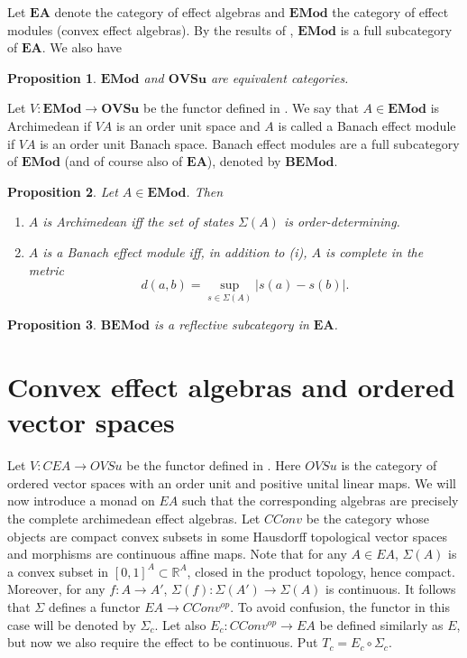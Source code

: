 \documentclass[12pt]{article}
\newtheorem{prop}{Proposition}
\newcommand{\<}{\langle}
\newcommand{\ct}[1]{\mathbf{#1}}
\begin{document}
Let $\ct{EA}$ denote the category of effect algebras and $\ct{EMod}$ the category of effect modules (convex effect algebras). By the results of \cite{sylvia_plus3}, 
$\ct{EMod}$ is a full subcategory of $\ct{EA}$. We also have

\begin{prop}\label{prop:EMod_OVSu}   $\ct{EMod}$ and $\ct{OVSu}$ are equivalent categories.

\end{prop}


Let $V: \ct{EMod}\to \ct{OVSu}$ be the functor defined in \cite{sylvia_plus3}. We say that $A\in \ct{EMod}$ is Archimedean if $VA$ is an order unit space and $A$ is called 
a Banach effect module  if $VA$ is an  order unit Banach space. Banach effect modules are a full subcategory of $\ct{EMod}$ (and of course also of $\ct{EA}$), denoted by 
$\ct{BEMod}$.

\begin{prop} Let $A\in \ct{EMod}$. Then 
\begin{enumerate}
\item[(i)] $A$ is Archimedean iff the set of states $\Sigma(A)$ is order-determining.
\item[(ii)] $A$ is a Banach effect module iff, in addition to (i), $A$ is complete in the metric
\[
d(a,b)=\sup_{s\in \Sigma(A)} |s(a)-s(b)|.
\] 
\end{enumerate}


\end{prop}

\begin{prop} $\ct{BEMod}$ is a reflective subcategory in $\ct{EA}$.


\end{prop}




\section{Convex effect algebras and ordered vector spaces}

Let $V: CEA\to OVSu$ be the functor defined in \cite{sylviaetc}. Here $OVSu$ is the category of ordered vector spaces with an order unit and positive unital linear maps. 
We will now introduce a monad on $EA$ such that the corresponding algebras are precisely the complete archimedean effect algebras. Let $CConv$ be the category whose objects are compact convex subsets in some Hausdorff topological vector spaces
 and morphisms are continuous affine maps. Note that for any $A\in EA$, $\Sigma(A)$ is a convex subset in $[0,1]^A\subset \mathbb R^A$, closed in the product topology, hence compact. Moreover, for any $f:A\to A'$, $\Sigma(f):\Sigma(A')\to \Sigma(A)$ is continuous. It follows that $\Sigma$ defines a functor $EA\to  CConv^{op}$. To avoid confusion, the functor in this case will be denoted by $\Sigma_c$. Let also $E_c:CConv^{op}\to EA$ be defined similarly as $E$, but now we also require the effect to be continuous. Put $T_c=E_c\circ\Sigma_c$.
\end{document}
